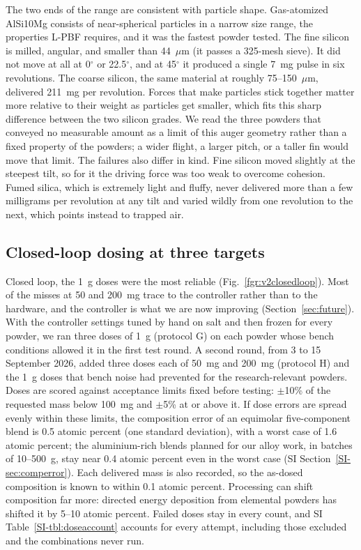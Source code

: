 \documentclass[twoside,twocolumn,9pt]{article}
\newcommand{\siref}[1]{\ref*{SI-#1}}
\begin{document}
The two ends of the range are consistent with particle shape. Gas-atomized AlSi10Mg consists of near-spherical particles in a narrow size range, the properties L-PBF requires, and it was the fastest powder tested. The fine silicon is milled, angular, and smaller than 44~$\mu$m (it passes a 325-mesh sieve). It did not move at all at 0$^\circ$ or 22.5$^\circ$, and at 45$^\circ$ it produced a single 7~mg pulse in six revolutions. The coarse silicon, the same material at roughly 75--150~$\mu$m, delivered 211~mg per revolution. Forces that make particles stick together matter more relative to their weight as particles get smaller, which fits this sharp difference between the two silicon grades. We read the three powders that conveyed no measurable amount as a limit of this auger geometry rather than a fixed property of the powders; a wider flight, a larger pitch, or a taller fin would move that limit. The failures also differ in kind. Fine silicon moved slightly at the steepest tilt, so for it the driving force was too weak to overcome cohesion. Fumed silica, which is extremely light and fluffy, never delivered more than a few milligrams per revolution at any tilt and varied wildly from one revolution to the next, which points instead to trapped air.

\subsection{Closed-loop dosing at three targets}
\label{sec:closedloop}

Closed loop, the 1~g doses were the most reliable (Fig.~\ref{fgr:v2closedloop}). Most of the misses at 50 and 200~mg trace to the controller rather than to the hardware, and the controller is what we are now improving (Section~\ref{sec:future}). With the controller settings tuned by hand on salt and then frozen for every powder, we ran three doses of 1~g (protocol G) on each powder whose bench conditions allowed it in the first test round. A second round, from 3 to 15 September 2026, added three doses each of 50~mg and 200~mg (protocol H) and the 1~g doses that bench noise had prevented for the research-relevant powders. Doses are scored against acceptance limits fixed before testing: $\pm$10\% of the requested mass below 100~mg and $\pm$5\% at or above it. If dose errors are spread evenly within these limits, the composition error of an equimolar five-component blend\cite{Vecchio2021Throughput,Moorehead2020Throughput} is 0.5 atomic percent (one standard deviation), with a worst case of 1.6 atomic percent; the aluminium-rich blends planned for our alloy work, in batches of 10--500~g, stay near 0.4 atomic percent even in the worst case (SI Section~\siref{sec:comperror}). Each delivered mass is also recorded, so the as-dosed composition is known to within 0.1 atomic percent. Processing can shift composition far more: directed energy deposition from elemental powders has shifted it by 5--10 atomic percent.\cite{Moorehead2020Throughput,Chen2020Elemental} Failed doses stay in every count, and SI Table~\siref{tbl:doseaccount} accounts for every attempt, including those excluded and the combinations never run.
\end{document}
